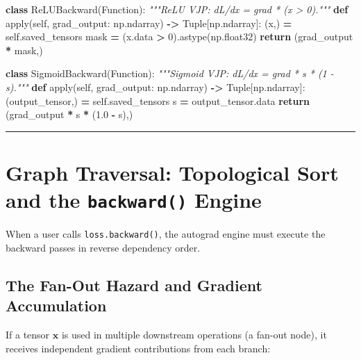 \documentclass[
  letterpaper,
]{scrbook}
\newenvironment{Shaded}{\begin{snugshade}}{\end{snugshade}}
\newcommand{\BuiltInTok}[1]{#1}
\newcommand{\CommentTok}[1]{\textcolor[rgb]{0.56,0.35,0.01}{\textit{#1}}}
\newcommand{\ControlFlowTok}[1]{\textcolor[rgb]{0.13,0.29,0.53}{\textbf{#1}}}
\newcommand{\DecValTok}[1]{\textcolor[rgb]{0.00,0.00,0.81}{#1}}
\newcommand{\FloatTok}[1]{\textcolor[rgb]{0.00,0.00,0.81}{#1}}
\newcommand{\KeywordTok}[1]{\textcolor[rgb]{0.13,0.29,0.53}{\textbf{#1}}}
\newcommand{\NormalTok}[1]{#1}
\newcommand{\OperatorTok}[1]{\textcolor[rgb]{0.81,0.36,0.00}{\textbf{#1}}}
\newcommand{\VariableTok}[1]{\textcolor[rgb]{0.00,0.00,0.00}{#1}}
\begin{document}
\begin{Shaded}
\begin{Highlighting}[]
\KeywordTok{class}\NormalTok{ ReLUBackward(Function):}
    \CommentTok{"""ReLU VJP: dL/dx = grad * (x \textgreater{} 0)."""}
    \KeywordTok{def} \BuiltInTok{apply}\NormalTok{(}\VariableTok{self}\NormalTok{, grad\_output: np.ndarray) }\OperatorTok{{-}\textgreater{}}\NormalTok{ Tuple[np.ndarray]:}
\NormalTok{        (x,) }\OperatorTok{=} \VariableTok{self}\NormalTok{.saved\_tensors}
\NormalTok{        mask }\OperatorTok{=}\NormalTok{ (x.data }\OperatorTok{\textgreater{}} \DecValTok{0}\NormalTok{).astype(np.float32)}
        \ControlFlowTok{return}\NormalTok{ (grad\_output }\OperatorTok{*}\NormalTok{ mask,)}

\KeywordTok{class}\NormalTok{ SigmoidBackward(Function):}
    \CommentTok{"""Sigmoid VJP: dL/dx = grad * s * (1 {-} s)."""}
    \KeywordTok{def} \BuiltInTok{apply}\NormalTok{(}\VariableTok{self}\NormalTok{, grad\_output: np.ndarray) }\OperatorTok{{-}\textgreater{}}\NormalTok{ Tuple[np.ndarray]:}
\NormalTok{        (output\_tensor,) }\OperatorTok{=} \VariableTok{self}\NormalTok{.saved\_tensors}
\NormalTok{        s }\OperatorTok{=}\NormalTok{ output\_tensor.data}
        \ControlFlowTok{return}\NormalTok{ (grad\_output }\OperatorTok{*}\NormalTok{ s }\OperatorTok{*}\NormalTok{ (}\FloatTok{1.0} \OperatorTok{{-}}\NormalTok{ s),)}
\end{Highlighting}
\end{Shaded}

\begin{center}\rule{0.5\linewidth}{0.5pt}\end{center}

\section{\texorpdfstring{Graph Traversal: Topological Sort and the
\texttt{backward()}
Engine}{Graph Traversal: Topological Sort and the backward() Engine}}\label{graph-traversal-topological-sort-and-the-backward-engine}

When a user calls \texttt{loss.backward()}, the autograd engine must
execute the backward passes in reverse dependency order.

\subsection{The Fan-Out Hazard and Gradient
Accumulation}\label{the-fan-out-hazard-and-gradient-accumulation}

If a tensor \(\mathbf{x}\) is used in multiple downstream operations (a
fan-out node), it receives independent gradient contributions from each
branch:
\end{document}
